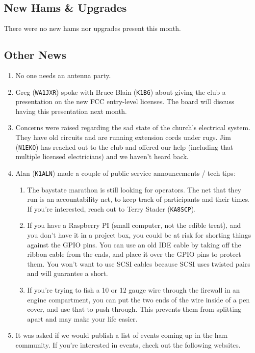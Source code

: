 \documentclass[10pt,letterpaper]{article}
\begin{document}
\subsection{New Hams \& Upgrades}
There were no new hams nor upgrades present this month.

\subsection{Other News}
\begin{enumerate}
  \item No one needs an antenna party.
  \item Greg (\texttt{WA1JXR}) spoke with Bruce Blain (\texttt{K1BG}) about giving the club a presentation on the new FCC entry-level licenses. The board will discuss having this presentation next month.
  \item Concerns were raised regarding the sad state of the church's electrical system. They have old circuits and are running extension cords under rugs. Jim (\texttt{N1EKO}) has reached out to the club and offered our help (including that multiple licensed electricians) and we haven't heard back.
  \item Alan (\texttt{K1ALN}) made a couple of public service announcements / tech tips:
  \begin{enumerate}
    \item The baystate marathon is still looking for operators. The net that they run is an accountability net, to keep track of participants and their times. If you're interested, reach out to Terry Stader (\texttt{KA8SCP}).
    \item If you have a Raspberry PI (small computer, not the edible treat), and you don't have it in a project box, you could be at risk for shorting things against the GPIO pins. You can use an old IDE cable by taking off the ribbon cable from the ends, and place it over the GPIO pins to protect them. You won't want to use SCSI cables because SCSI uses twisted pairs and will guarantee a short.
    \item If you're trying to fish a 10 or 12 gauge wire through the firewall in an engine compartment, you can put the two ends of the wire inside of a pen cover, and use that to push through. This prevents them from splitting apart and may make your life easier.
  \end{enumerate}
  \item It was asked if we would publish a list of events coming up in the ham community. If you're interested in events, check out the following websites.

\end{enumerate}
\end{document}
